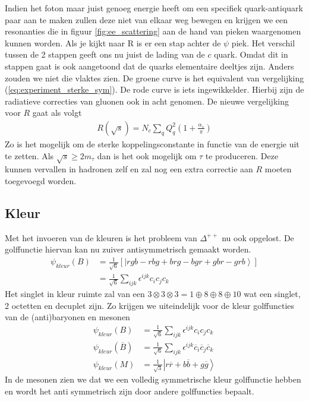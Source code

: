 \documentclass[../main.tex]{subfiles}
\begin{document}
Indien het foton maar juist genoeg energie heeft om een specifiek quark-antiquark paar aan te maken zullen deze niet van elkaar weg bewegen en krijgen we een resonanties die in figuur \ref{fig:ee_scattering} aan de hand van pieken waargenomen kunnen worden. Als je kijkt naar R is er een stap achter de $\psi$ piek. Het verschil tussen de 2 stappen geeft ons nu juist de lading van de $c$ quark. Omdat dit in stappen gaat is ook aangetoond dat de quarks elementaire deeltjes zijn. Anders zouden we niet die vlaktes zien. De groene curve is het equivalent van vergelijking (\ref{eq:experiment_sterke_sym}). De rode curve is iets ingewikkelder. Hierbij zijn de radiatieve correcties van gluonen ook in acht genomen. De nieuwe vergelijking voor $R$ gaat als volgt
\begin{equation}
    \begin{aligned}
        \label{eq:experiment_sterke_sym_extended}
        R(\sqrt{s}) = N_c\sum_q Q_q^2 (1+\frac{\alpha_s}{\pi})
    \end{aligned}
\end{equation}
Zo is het mogelijk om de sterke koppelingsconstante in functie van de energie uit te zetten. Als $\sqrt{s}\geq 2m_\tau$ dan is het ook mogelijk om $\tau$ te produceren. Deze kunnen vervallen in hadronen zelf en zal nog een extra correctie aan $R$ moeten toegevoegd worden.

\subsection{Kleur}%
\label{sub:kleur}

Met het invoeren van de kleuren is het probleem van $\Delta^{++}$ nu ook opgelost. De golffunctie hiervan kan nu zuiver antisymmetrisch gemaakt worden.
\begin{equation}
    \begin{aligned}
        \label{eq:golffunctie_baryon}
        \psi_{kleur}(B) &= \frac{1}{\sqrt{6}} [\left|rgb-rbg+brg-bgr+gbr-grb\right>]\\
                        &= \frac{1}{\sqrt{6}} \sum_{ijk} \epsilon^{ijk}c_ic_jc_k
    \end{aligned}
\end{equation}
Het singlet in kleur ruimte zal van een $3\otimes 3\otimes 3 = 1\oplus 8\oplus 8\oplus 10$ wat een singlet, 2 octetten en decuplet zijn. Zo krijgen we uiteindelijk voor de kleur golffuncties van de (anti)baryonen en mesonen
\begin{equation}
    \begin{aligned}
        \label{eq:kleur_golffunctie}
        \psi_{kleur}(B) &= \frac{1}{\sqrt{6}} \sum_{ijk} \epsilon^{ijk}c_ic_jc_k\\
        \psi_{kleur}(\overline B) &= \frac{1}{\sqrt{6}} \sum_{ijk} \epsilon^{ijk}\overline c_i \overline c_j\overline c_k\\
        \psi_{kleur}(M) &= \frac{1}{\sqrt{3}} \left|r\overline r + b\overline b + g\overline g \right>
    \end{aligned}
\end{equation}
In de mesonen zien we dat we een volledig symmetrische kleur golffunctie hebben en wordt het anti symmetrisch zijn door andere golffuncties bepaalt.
\end{document}
